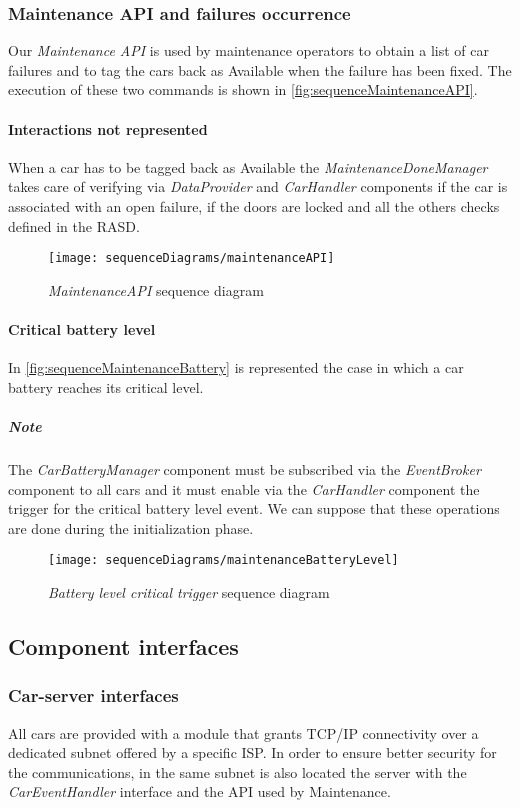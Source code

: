 \clearpage
\subsubsection{Maintenance API and failures occurrence}
Our \emph{Maintenance API} is used by maintenance operators to obtain a list of car failures and to tag the cars back as Available when the failure has been fixed. The execution of these two commands is shown in \autoref{fig:sequenceMaintenanceAPI}.
\paragraph{Interactions not represented}When a car has to be tagged back as \mbox{Available} the \emph{MaintenanceDoneManager} takes care of verifying via \emph{DataProvider} and \emph{CarHandler} components if the car is associated with an open failure, if the doors are locked and all the others checks defined in the RASD.

\begin{figure}[h!]
	\centering
	\texttt{[image: sequenceDiagrams/maintenanceAPI]}
	\caption{
		\label{fig:sequenceMaintenanceAPI} 
		\emph{MaintenanceAPI} sequence diagram
	}
\end{figure}

\clearpage
\paragraph{Critical battery level}In \autoref{fig:sequenceMaintenanceBattery} is represented the case in which a car battery reaches its critical level.
\subparagraph{Note} The \emph{CarBatteryManager} component must be subscribed via the \mbox{\emph{EventBroker}} component to all cars and it must enable via the \emph{CarHandler} component the trigger for the critical battery level event. We can suppose that these operations are done during the initialization phase.
\begin{figure}[h!]
	\centering
	\texttt{[image: sequenceDiagrams/maintenanceBatteryLevel]}
	\caption{
		\label{fig:sequenceMaintenanceBattery} 
		\emph{Battery level critical trigger} sequence diagram
	}
\end{figure}

\clearpage
\subsection{Component interfaces}

\subsubsection{Car-server interfaces}
All cars are provided with a module that grants TCP/IP connectivity over a dedicated subnet offered by a specific ISP. In order to ensure better security for the communications, in the same subnet is also located the server with the \mbox{\emph{CarEventHandler}} interface and the API used by Maintenance.

